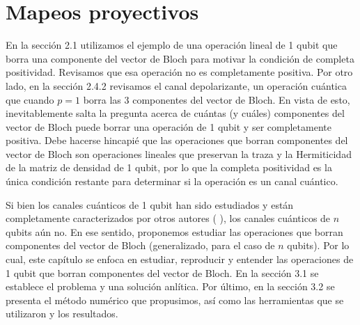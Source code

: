 \chapter{Mapeos proyectivos}  


En la sección 2.1 utilizamos el ejemplo de una operación lineal 
de 1 qubit que borra una componente del vector de Bloch para motivar
la condición de completa positividad. 
Revisamos que esa operación no es completamente positiva.
Por otro lado, en la sección 2.4.2 revisamos el 
canal depolarizante, un operación cuántica que cuando $p=1$
borra las 3 componentes del vector de Bloch. En vista de esto, 
inevitablemente salta la pregunta acerca de cuántas (y cuáles) 
componentes del vector de Bloch puede borrar una operación 
de 1 qubit y ser completamente positiva.
Debe hacerse hincapié que las operaciones que borran componentes 
del vector de Bloch son operaciones lineales que 
preservan la traza y la Hermiticidad de la 
matriz de densidad de 1 qubit, por lo que la completa positividad 
es la única condición restante para determinar si la operación 
es un canal cuántico.

Si bien los canales cuánticos de 1 qubit han sido estudiados y 
están completamente caracterizados por otros autores (
\cite{nielsen_chuang_2011}  \cite{bengtsson_zyczkowski_2017}), 
los canales cuánticos de $n$ 
qubits aún no. En ese sentido, proponemos estudiar las operaciones
que borran componentes del vector de Bloch (generalizado, para el 
caso de $n$ qubits). Por lo cual, este capítulo se enfoca en  
estudiar, reproducir y entender las operaciones de 1 qubit 
que borran componentes del vector de Bloch. En la sección 3.1
se establece el problema y una solución anlítica.
Por último, en la sección 3.2 se presenta el método numérico que 
propusimos, así como las herramientas que se utilizaron y 
los resultados.

